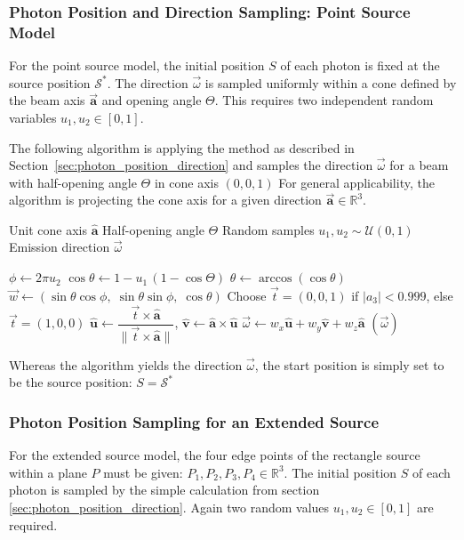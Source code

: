 \subsubsection{Photon Position and Direction Sampling: Point Source Model}

For the point source model, the initial position $S$ of each photon is fixed at
the source position $\mathcal{S}^*$. The direction $\vec{\omega}$ is sampled
uniformly within a cone defined by the beam axis $\vec{\textbf{a}}$ and opening
angle $\Theta$. This requires two independent random variables $u_1, u_2 \in
[0,1]$.

The following algorithm is applying the method as described in
Section~\ref{sec:photon_position_direction} and samples the direction
$\vec{\omega}$ for a beam with half-opening angle $\Theta$ in cone axis
$(0,0,1)$ For general applicability, the algorithm is projecting the cone axis
for a given direction $\vec{\textbf{a}} \in \mathbb{R}^3$.

\begin{algorithm}[H]
\caption{Photon Direction Sampling for a Point Source}
\label{alg:pointSourceSampling}
\begin{algorithmic}[1]
\Require Unit cone axis $\hat{\mathbf{a}}$
\Require Half-opening angle $\Theta$
\Require Random samples $u_1,u_2 \sim \mathcal{U}(0,1)$
\Ensure Emission direction $\vec{\omega}$

\State $\phi \gets 2\pi u_2$
\State $\cos\theta \gets 1 - u_1\,(1-\cos\Theta)$
\State $\theta \gets \arccos(\cos\theta)$
\State $\vec{w} \gets (\sin\theta\cos\phi,\;\sin\theta\sin\phi,\;\cos\theta)$ 
\State Choose $\vec{t}=(0,0,1)$ if $|a_3|<0.999$, else $\vec{t}=(1,0,0)$
\State $\hat{\mathbf{u}} \gets \dfrac{\vec{t}\times\hat{\mathbf{a}}}{\|\vec{t}\times\hat{\mathbf{a}}\|}$,\quad
      $\hat{\mathbf{v}} \gets \hat{\mathbf{a}}\times\hat{\mathbf{u}}$
\State $\vec{\omega} \gets w_x\hat{\mathbf{u}} + w_y\hat{\mathbf{v}} + w_z\hat{\mathbf{a}}$
\State \Return $(\vec{\omega})$
\end{algorithmic}
\end{algorithm}

Whereas the algorithm yields the direction $\vec{\omega}$, the start position is
simply set to be the source position: $S = \mathcal{S}^*$

\subsubsection{Photon Position Sampling for an Extended Source}
For the extended source model, the four edge points of the rectangle source
within a plane $P$ must be given: $P_1, P_2, P_3, P_4 \in \mathbb{R}^3$. The
initial position $S$ of each photon is sampled by the simple calculation from
section \ref{sec:photon_position_direction}. Again two random values $u_1, u_2
\in [0,1]$ are required.

